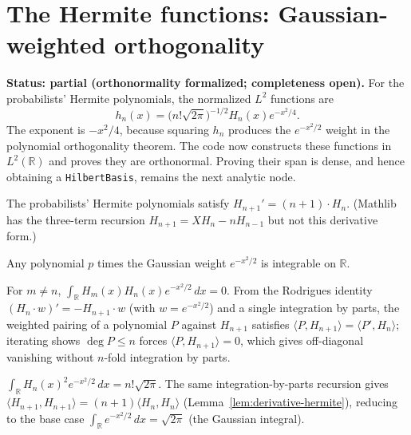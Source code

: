 \section{The Hermite functions: Gaussian-weighted orthogonality}
\label{sec:hermite-l2}

\textbf{Status: partial (orthonormality formalized; completeness open).}  For the
probabilists' Hermite polynomials, the normalized $L^2$ functions are
\[
  h_n(x)=\bigl(n!\sqrt{2\pi}\bigr)^{-1/2}H_n(x)e^{-x^2/4}.
\]
The exponent is $-x^2/4$, because squaring $h_n$ produces the $e^{-x^2/2}$ weight in the
polynomial orthogonality theorem.  The code now constructs these functions in $L^2(\mathbb R)$
and proves they are orthonormal.  Proving their span is dense, and hence obtaining a
\texttt{HilbertBasis}, remains the next analytic node.

\begin{lemma}
  \label{lem:derivative-hermite}
  \leanok
  The probabilists' Hermite polynomials satisfy $H_{n+1}' = (n+1) \cdot H_n$. (Mathlib has the
  three-term recursion $H_{n+1} = X H_n - n H_{n-1}$ but not this derivative form.)
\end{lemma}

\begin{lemma}
  \label{lem:integrable-aeval-mul-gaussian}
  \leanok
  Any polynomial $p$ times the Gaussian weight $e^{-x^2/2}$ is integrable on $\mathbb{R}$.
\end{lemma}

\begin{theorem}
  \label{thm:hermite-integral-eq-zero-of-ne}
  \leanok
  For $m \neq n$, $\int_{\mathbb{R}} H_m(x) H_n(x) e^{-x^2/2}\,dx = 0$. From the Rodrigues
  identity $(H_n \cdot w)' = -H_{n+1} \cdot w$ (with $w = e^{-x^2/2}$) and a single integration
  by parts, the weighted pairing of a polynomial $P$ against $H_{n+1}$ satisfies
  $\langle P, H_{n+1}\rangle = \langle P', H_n\rangle$; iterating shows $\deg P \leq n$ forces
  $\langle P, H_{n+1}\rangle = 0$, which gives off-diagonal vanishing without $n$-fold
  integration by parts.
\end{theorem}

\begin{theorem}
  \label{thm:hermite-integral-self}
  \leanok
  $\int_{\mathbb{R}} H_n(x)^2 e^{-x^2/2}\,dx = n! \sqrt{2\pi}$. The same integration-by-parts
  recursion gives $\langle H_{n+1}, H_{n+1}\rangle = (n+1) \langle H_n, H_n \rangle$
  (Lemma~\ref{lem:derivative-hermite}), reducing to the base case
  $\int_{\mathbb{R}} e^{-x^2/2}\,dx = \sqrt{2\pi}$ (the Gaussian integral).
\end{theorem}

